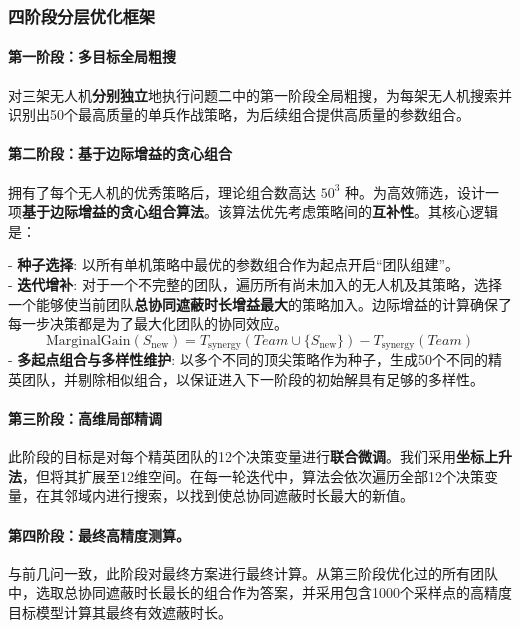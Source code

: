 \documentclass[12pt]{article}
\begin{document}
\begin{CJK}{UTF8}{gbsn}
		\subsubsection{四阶段分层优化框架}
		\paragraph{第一阶段：多目标全局粗搜}
		对三架无人机\textbf{分别独立}地执行问题二中的第一阶段全局粗搜，为每架无人机搜索并识别出50个最高质量的单兵作战策略，为后续组合提供高质量的参数组合。
		
		\paragraph{第二阶段：基于边际增益的贪心\cite{5}组合} 拥有了每个无人机的优秀策略后，理论组合数高达 $50^3$ 种。为高效筛选，设计一项\textbf{基于边际增益的贪心组合算法}。该算法优先考虑策略间的\textbf{互补性}。其核心逻辑是：
		
		\indent - \textbf{种子选择}: 以所有单机策略中最优的参数组合作为起点开启“团队组建”。\\
		\indent - \textbf{迭代增补}: 对于一个不完整的团队，遍历所有尚未加入的无人机及其策略，选择一个能够使当前团队\textbf{总协同遮蔽时长增益最大}的策略加入。边际增益的计算确保了每一步决策都是为了最大化团队的协同效应。\\
		\begin{equation}
			\text{MarginalGain}(S_{\text{new}}) = T_{\text{synergy}}(Team \cup \{S_{\text{new}}\}) - T_{\text{synergy}}(Team)
		\end{equation}
		\indent - \textbf{多起点组合与多样性维护}: 以多个不同的顶尖策略作为种子，生成50个不同的精英团队，并剔除相似组合，以保证进入下一阶段的初始解具有足够的多样性。
		
		
		\paragraph{第三阶段：高维局部精调}
		此阶段的目标是对每个精英团队的12个决策变量进行\textbf{联合微调}。我们采用\textbf{坐标上升法}，但将其扩展至12维空间。在每一轮迭代中，算法会依次遍历全部12个决策变量，在其邻域内进行搜索，以找到使总协同遮蔽时长最大的新值。
		
		\paragraph{第四阶段：最终高精度测算。}
		与前几问一致，此阶段对最终方案进行最终计算。从第三阶段优化过的所有团队中，选取总协同遮蔽时长最长的组合作为答案，并采用包含1000个采样点的高精度目标模型计算其最终有效遮蔽时长。
		

\end{CJK}
\end{document}
